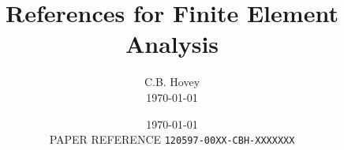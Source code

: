 \documentclass[10pt,reqno]{amsart}
\title{References for 
       Finite Element Analysis}
\author{C.B. Hovey \\ \sc\today}
\date{\today \\ PAPER REFERENCE {\tt 120597-00XX-CBH-XXXXXXX}}
\begin{document}
\maketitle


\nocite{
Curnier94,
Hughes96,
Hughes87,
Prathap85,
Rabevala90,
Simo98}







%
\end{document}
